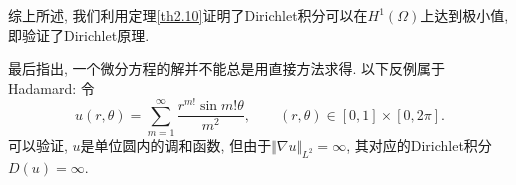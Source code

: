 综上所述, 我们利用定理\ref{th2.10}证明了Dirichlet积分可以在$H^1(\Omega)$上达到极小值, 即验证了Dirichlet原理.

最后指出, 一个微分方程的解并不能总是用直接方法求得. 以下反例属于Hadamard: 令 
\begin{equation*}
    u(r, \theta) = \sum_{m = 1}^{\infty}\frac{r^{m!}\sin m!\theta}{m^2}, \qquad (r, \theta) \in [0, 1] \times [0, 2\pi].
\end{equation*}
可以验证, $u$是单位圆内的调和函数, 但由于$\Vert \nabla u\Vert_{L^2} = \infty$, 其对应的Dirichlet积分$D(u) = \infty$.
